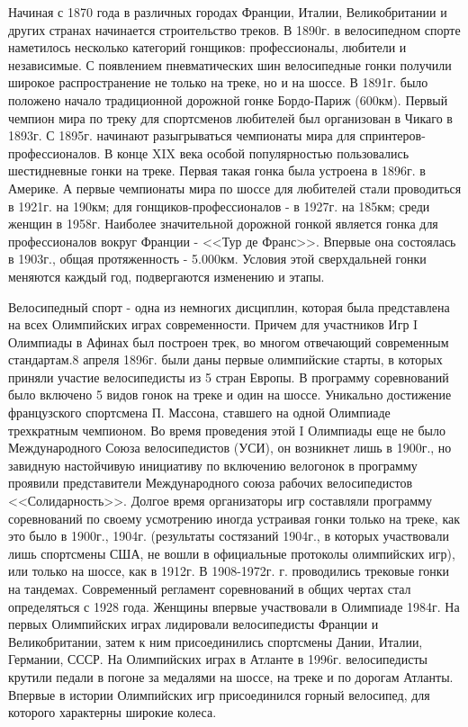 \documentclass[a4paper,14pt]{extreport}
\begin{document}
Начиная с 1870 года в различных городах Франции, Италии, Великобритании и других странах начинается строительство треков. В 1890г. в велосипедном спорте наметилось несколько категорий гонщиков: профессионалы, любители и независимые. С появлением пневматических шин велосипедные гонки получили широкое распространение не только на треке, но и на шоссе. В 1891г. было положено начало традиционной дорожной гонке Бордо-Париж (600км). Первый чемпион мира по треку для спортсменов любителей был организован в Чикаго в 1893г. С 1895г. начинают разыгрываться чемпионаты мира для спринтеров-профессионалов. В конце XIX века особой популярностью пользовались шестидневные гонки на треке. Первая такая гонка была устроена в 1896г. в Америке. А первые чемпионаты мира по шоссе для любителей стали проводиться в 1921г. на 190км; для гонщиков-профессионалов - в 1927г. на 185км; среди женщин в 1958г. Наиболее значительной дорожной гонкой является гонка для профессионалов вокруг Франции - <<Тур де Франс>>. Впервые она состоялась в 1903г., общая протяженность - 5.000км. Условия этой сверхдальней гонки меняются каждый год, подвергаются изменению и этапы.

Велосипедный спорт - одна из немногих дисциплин, которая была представлена на всех Олимпийских играх современности. Причем для участников Игр I Олимпиады в Афинах был построен трек, во многом отвечающий современным стандартам.8 апреля 1896г. были даны первые олимпийские старты, в которых приняли участие велосипедисты из 5 стран Европы. В программу соревнований было включено 5 видов гонок на треке и один на шоссе. Уникально достижение французского спортсмена П. Массона, ставшего на одной Олимпиаде трехкратным чемпионом. Во время проведения этой I Олимпиады еще не было Международного Союза велосипедистов (УСИ), он возникнет лишь в 1900г., но завидную настойчивую инициативу по включению велогонок в программу проявили представители Международного союза рабочих велосипедистов <<Солидарность>>. Долгое время организаторы игр составляли программу соревнований по своему усмотрению иногда устраивая гонки только на треке, как это было в 1900г., 1904г. (результаты состязаний 1904г., в которых участвовали лишь спортсмены США, не вошли в официальные протоколы олимпийских игр), или только на шоссе, как в 1912г. В 1908-1972г. г. проводились трековые гонки на тандемах. Современный регламент соревнований в общих чертах стал определяться с 1928 года. Женщины впервые участвовали в Олимпиаде 1984г. На первых Олимпийских играх лидировали велосипедисты Франции и Великобритании, затем к ним присоединились спортсмены Дании, Италии, Германии, СССР. На Олимпийских играх в Атланте в 1996г. велосипедисты крутили педали в погоне за медалями на шоссе, на треке и по дорогам Атланты. Впервые в истории Олимпийских игр присоединился горный велосипед, для которого характерны широкие колеса.
\end{document}
